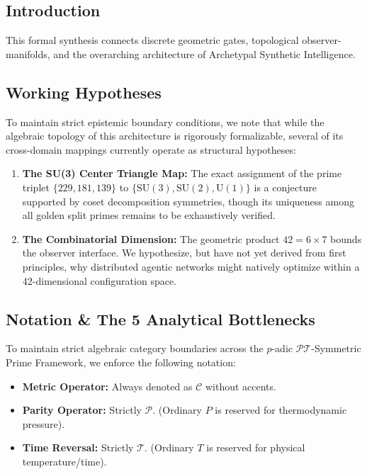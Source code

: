 \vspace{1em}


\subsection*{Introduction}
This formal synthesis connects discrete geometric gates, topological observer-manifolds, and the overarching architecture of Archetypal Synthetic Intelligence.

\subsection*{Working Hypotheses}
To maintain strict epistemic boundary conditions, we note that while the algebraic topology of this architecture is rigorously formalizable, several of its cross-domain mappings currently operate as structural hypotheses:
\begin{enumerate}
    \item \textbf{The SU(3) Center Triangle Map:} The exact assignment of the prime triplet $\{229, 181, 139\}$ to $\{\text{SU}(3), \text{SU}(2), \text{U}(1)\}$ is a conjecture supported by coset decomposition symmetries, though its uniqueness among all golden split primes remains to be exhaustively verified.
    \item \textbf{The Combinatorial Dimension:} The geometric product $42 = 6 \times 7$ bounds the observer interface. We hypothesize, but have not yet derived from first principles, why distributed agentic networks might natively optimize within a 42-dimensional configuration space.
\end{enumerate}

\subsection*{Notation \& The 5 Analytical Bottlenecks}
To maintain strict algebraic category boundaries across the $p$-adic $\mathcal{PT}$-Symmetric Prime Framework, we enforce the following notation:
\begin{itemize}
    \item \textbf{Metric Operator:} Always denoted as $\mathcal{C}$ without accents.
    \item \textbf{Parity Operator:} Strictly $\mathcal{P}$. (Ordinary $P$ is reserved for thermodynamic pressure).
    \item \textbf{Time Reversal:} Strictly $\mathcal{T}$. (Ordinary $T$ is reserved for physical temperature/time).
\end{itemize}

